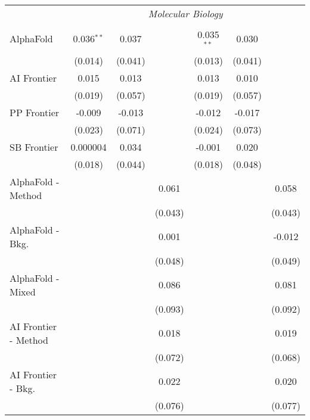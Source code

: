 \begin{tabular}{lcccccc}
 & \multicolumn{6}{c}{\textit{Molecular Biology}} \\ \\
   AlphaFold            & 0.036$^{**}$ & 0.037   &           & 0.035$^{**}$ & 0.030   &   \\   
                        & (0.014)      & (0.041) &           & (0.013)      & (0.041) &   \\   
   AI Frontier          & 0.015        & 0.013   &           & 0.013        & 0.010   &   \\   
                        & (0.019)      & (0.057) &           & (0.019)      & (0.057) &   \\   
   PP Frontier          & -0.009       & -0.013  &           & -0.012       & -0.017  &   \\   
                        & (0.023)      & (0.071) &           & (0.024)      & (0.073) &   \\   
   SB Frontier          & 0.000004     & 0.034   &           & -0.001       & 0.020   &   \\   
                        & (0.018)      & (0.044) &           & (0.018)      & (0.048) &   \\   
   AlphaFold - Method   &              &         & 0.061     &              &         & 0.058\\   
                        &              &         & (0.043)   &              &         & (0.043)\\   
   AlphaFold - Bkg.     &              &         & 0.001     &              &         & -0.012\\   
                        &              &         & (0.048)   &              &         & (0.049)\\   
   AlphaFold - Mixed    &              &         & 0.086     &              &         & 0.081\\   
                        &              &         & (0.093)   &              &         & (0.092)\\   
   AI Frontier - Method &              &         & 0.018     &              &         & 0.019\\   
                        &              &         & (0.072)   &              &         & (0.068)\\   
   AI Frontier - Bkg.   &              &         & 0.022     &              &         & 0.020\\   
                        &              &         & (0.076)   &              &         & (0.077)\\   

\end{tabular}
